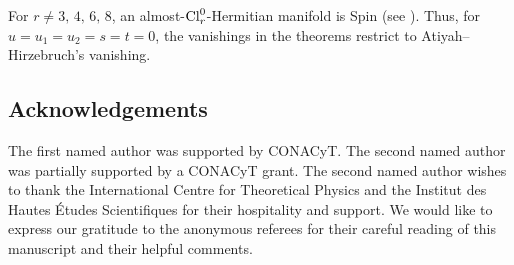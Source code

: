 \documentclass[10pt,a4paper]{amsart}
\numberwithin{equation}{section}
\begin{document}
\begin{Remark}For $r\not = 3,\,4,\,6,\,8$, an almost-${\rm Cl}_r^0$-Hermitian manifold is Spin (see \cite[Theo\-rem~4.1]{Arizmendi-Garcia-Herrera}). Thus, for $u=u_1=u_2=s=t=0$, the vanishings in the theorems restrict to Atiyah--Hirzebruch's vanishing.
\end{Remark}

\subsection*{Acknowledgements}

The f\/irst named author was supported by CONACyT. The second named author was partially supported by a CONACyT grant. The second named author wishes to thank the International Centre for Theoretical Physics and the Institut des Hautes \'Etudes Scientif\/iques for their hospitality and support. We would like to express our gratitude to the anonymous referees for their careful reading of this manuscript and their helpful comments.

\end{document}

